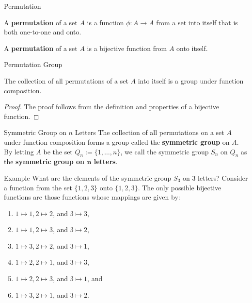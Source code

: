 \documentclass{beamer}
\begin{document}
\begin{frame}{Permutation}
\begin{definition}
\justifying
A \textbf{permutation} of a set $A$ is a function $\phi: A \rightarrow A$ from a set into itself that is both one-to-one and onto. 
\end{definition}
\pause
\begin{definition}[Restated]
\justifying
A \textbf{permutation} of a set $A$ is a bijective function from $A$ onto itself.
\end{definition}
\end{frame}

\begin{frame}{Permutation Group}
\justifying
\begin{theorem}
\justifying
The collection of all permutations of a set $A$ into itself is a group under function composition.
\end{theorem}
\pause
\begin{proof}
\justifying
The proof follows from the definition and properties of a bijective function.
\end{proof}
\end{frame}

\begin{frame}{Symmetric Group on $n$ Letters}
\justifying
The collection of all permutations on a set $A$ under function composition forms a group called the \textbf{symmetric group} on $A$. By letting $A$ be the set $Q_n := \{1, \dots, n\}$, we call the symmetric group $S_n$ on $Q_n$ as the \textbf{symmetric group on $\boldsymbol{n}$ letters}.    
\end{frame}

\begin{frame}{Example}
What are the elements of the symmetric group $S_3$ on $3$ letters? \newline\newline
\pause
Consider a function from the set $\{1, 2, 3\}$ onto $\{1, 2, 3\}$. The only possible bijective functions are those functions whose mappings are given by:
\begin{enumerate}
\item $1 \mapsto 1, 2 \mapsto 2$, and $3 \mapsto 3$,
\item $1 \mapsto 1, 2 \mapsto 3$, and $3 \mapsto 2$,
\item $1 \mapsto 3, 2 \mapsto 2$, and $3 \mapsto 1$,
\item $1 \mapsto 2, 2 \mapsto 1$, and $3 \mapsto 3$,
\item $1 \mapsto 2, 2 \mapsto 3$, and $3 \mapsto 1$, and
\item $1 \mapsto 3, 2 \mapsto 1$, and $3 \mapsto 2$.
\end{enumerate}
\end{frame}
\end{document}
